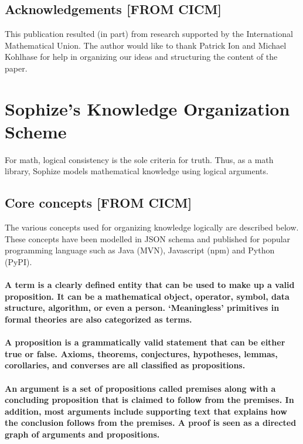 \documentclass[a4paper]{article}
\begin{document}
\subsection*{Acknowledgements [FROM CICM]}
This publication resulted (in part) from research supported by the International Mathematical Union. The author would like to thank Patrick Ion and Michael Kohlhase for help in organizing our ideas and structuring the content of the paper.

\section{Sophize's Knowledge Organization Scheme}
For math, logical consistency is the sole criteria for truth. Thus, as a math library, Sophize models mathematical knowledge using logical arguments. 

\subsection{Core concepts [FROM CICM]}
The various concepts used for organizing knowledge logically are described below. These concepts have been modelled in JSON schema \cite{sophize_datamodel} and published for popular programming language such as Java (MVN), Javascript (npm) and Python (PyPI). 

\paragraph{A \textbf{term} is a clearly defined entity that can be used to make up a valid proposition. It can be a mathematical object, operator, symbol, data structure, algorithm, or even a person. `Meaningless' primitives in formal theories are also categorized as terms.}

\paragraph{A \textbf{proposition} is a grammatically valid statement that can be either true or false. Axioms, theorems, conjectures, hypotheses, lemmas, corollaries, and converses are all classified as propositions.}

\paragraph{An \textbf{argument} is a set of propositions called premises along with a concluding proposition that is claimed to follow from the premises. In addition, most arguments include supporting text that explains how the conclusion follows from the premises. A proof is seen as a directed graph of arguments and propositions.}
\end{document}
